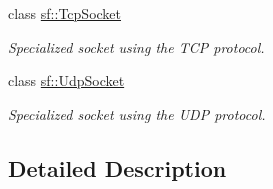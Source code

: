 \begin{DoxyCompactItemize}
class \hyperlink{classsf_1_1_tcp_socket}{sf\-::\-Tcp\-Socket}
\begin{DoxyCompactList}\small\item\em Specialized socket using the T\-C\-P protocol. \end{DoxyCompactList}\item 
class \hyperlink{classsf_1_1_udp_socket}{sf\-::\-Udp\-Socket}
\begin{DoxyCompactList}\small\item\em Specialized socket using the U\-D\-P protocol. \end{DoxyCompactList}\end{DoxyCompactItemize}


\subsection{Detailed Description}
